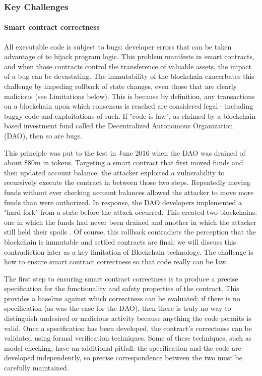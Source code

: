 {\subsubsection{Key Challenges}
\paragraph{Smart contract correctness}
All executable code is subject to bugs: developer errors that can be taken advantage of to hijack program logic. This problem manifests in smart contracts, and when those contracts control the transference of valuable assets, the impact of a bug can be devastating. The immutability of the blockchain exacerbates this challenge by impeding rollback of state changes, even those that are clearly malicious (see Limitations below). This is because by definition, any transactions on a blockchain upon which consensus is reached are considered legal - including buggy code and exploitations of such. If "code is law", as claimed by a blockchain-based investment fund called the Decentralized Autonomous Organization (DAO), then so are bugs. 

This principle was put to the test in June 2016 when the DAO was drained of about \$80m in tokens. Targeting a smart contract that first moved funds and then updated account balance, the attacker exploited a vulnerability to recursively execute the contract in between those two steps. Repeatedly moving funds without ever checking account balances allowed the attacker to move more funds than were authorized. In response, the DAO developers implemented a "hard fork" from a state before the attack occurred. This created two blockchains: one in which the funds had never been drained and another in which the attacker still held their spoils \cite{Castillo16}. Of course, this rollback contradicts the perception that the blockchain is immutable and settled contracts are final; we will discuss this contradiction later as a key limitation of Blockchain technology. The challenge is how to ensure smart contract correctness so that code really can be law.

The first step to ensuring smart contract correctness is to produce a precise specification for the functionality and safety properties of the contract. This provides a baseline against which correctness can be evaluated; if there is no specification (as was the case for the DAO), then there is truly no way to distinguish undesired or malicious activity because anything the code permits is valid. Once a specification has been developed, the contract's correctness can be validated using formal verification techniques. Some of these techniques, such as model-checking, have an additional pitfall: the specification and the code are developed independently, so precise correspondence between the two must be carefully maintained.

}
